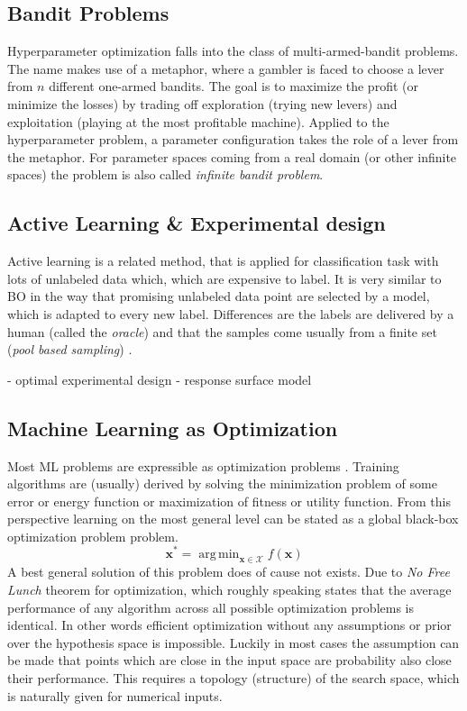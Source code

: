 \documentclass[english]{article}
\newcommand{\x}{\mathbf{x}}
\DeclareMathOperator*{\argmin}{arg\,min}
\begin{document}
\subsection{Bandit Problems}
Hyperparameter optimization falls into the class of multi-armed-bandit problems. The name makes use of a metaphor, where a gambler is faced to choose a lever from $n$ different one-armed bandits. The goal is to maximize the profit (or minimize the losses) by trading off exploration (trying new levers) and exploitation (playing at the most profitable machine). Applied to the hyperparameter problem, a parameter configuration takes the role of a lever from the metaphor. For parameter spaces coming from a real domain (or other infinite spaces) the problem is also called \textit{infinite bandit problem}.



\subsection{Active Learning \& Experimental design}
Active learning is a related method, that is applied for classification task with lots of unlabeled data which, which are expensive to label. It is very similar to BO in the way that promising unlabeled data point are selected by a model, which is adapted to every new label. Differences are the labels are delivered by a human (called the \textit{oracle}) and that the samples come usually from a finite set (\textit{pool based sampling}) \cite{settles_active_2010}.

 - optimal experimental design
 - response surface model

\subsection{Machine Learning as Optimization}
Most ML problems are expressible as optimization problems \cite{bennett_interplay_2006}. Training algorithms are (usually) derived by solving the minimization problem of some error or energy function or maximization of fitness or utility function. From this perspective learning on the most general level can be stated as a global black-box optimization problem problem.
$$\x^* = \argmin_{\x \in \mathcal{X}} f(\x)$$
A best general solution of this problem does of cause not exists. Due to \textit{No Free Lunch} theorem for optimization, which roughly speaking states that the average performance of any algorithm across all possible optimization problems is identical. In other words efficient optimization without any assumptions or prior over the hypothesis space is impossible. Luckily in most cases the assumption can be made that points which are close in the input space are probability also close their performance. This requires a topology (structure) of the search space, which is naturally given for numerical inputs.
\end{document}
